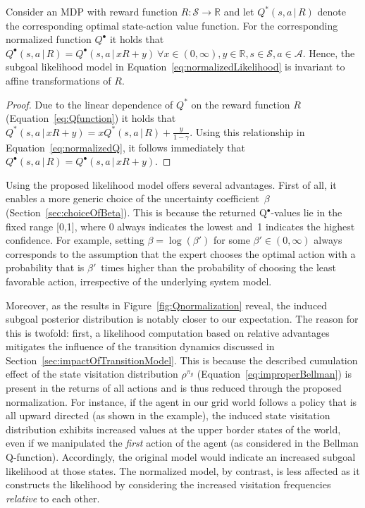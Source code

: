 \documentclass[twoside,11pt]{article}
\newcommand{\given}{\,\vert\,}
\begin{document}
\vspace{0.5\baselineskip}
\begin{proposition}
Consider an MDP with reward function $R:\mathcal{S}\rightarrow\mathbb{R}$ %
and let $Q^*(s,a \given R)$ denote the corresponding optimal state-action value function. For the corresponding normalized function $Q^\bullet$ it holds that $Q^\bullet(s,a \given R) = Q^\bullet(s,a \given xR+y) \ \forall x\in(0,\infty),y\in\mathbb{R}, s\in\mathcal{S}, a\in\mathcal{A}$. Hence, the subgoal likelihood model in Equation~\eqref{eq:normalizedLikelihood} is invariant to affine transformations of $R$.
\end{proposition}
%

\begin{proof}
Due to the linear dependence of $Q^*$ on the reward function $R$ (Equation~\ref{eq:Qfunction}) it holds that $Q^*(s,a \given xR+y) = xQ^*(s,a \given R) + \frac{y}{1-\gamma}$. Using this relationship in Equation~\eqref{eq:normalizedQ}, it follows immediately that $Q^\bullet(s,a \given R) = Q^\bullet(s,a \given xR+y)$.
\end{proof}
%

\noindent Using the proposed likelihood model offers several advantages. First of all, it enables a %
more generic choice of the uncertainty coefficient~$\beta$ (Section~\ref{sec:choiceOfBeta}). This is because the returned Q$^\bullet$-values lie in the fixed range [0,1], where 0 always indicates the lowest and~1 indicates the highest confidence. For example, setting $\beta=\log(\beta')$ for some $\beta'\in(0,\infty)$ always %
%
corresponds to the assumption that the expert chooses the optimal action with a probability that is $\beta'$~times higher than the probability of choosing the least favorable action, irrespective of the underlying system model. 

Moreover, as the results in Figure~\ref{fig:Qnormalization} reveal, the induced subgoal posterior distribution is notably closer to our expectation. %
%
The reason for this is twofold: first, a likelihood computation based on relative advantages mitigates the %
influence of the transition dynamics discussed in Section~\ref{sec:impactOfTransitionModel}. This is because the described cumulation effect of the state visitation distribution $\rho^{\pi_g}$ (Equation~\ref{eq:improperBellman}) %
is present %
in the returns of all actions and is thus %
reduced through the proposed normalization. For instance, if the agent in our grid world follows a policy that is all upward directed (as shown in the example), the induced state visitation distribution exhibits increased values at the upper border states of the world, even if we manipulated the \textit{first} action of the agent (as considered in the Bellman Q-function). Accordingly, the original model would indicate an increased subgoal likelihood at those states. %
The normalized model, by contrast, is less affected as it constructs the likelihood by considering the increased visitation frequencies \textit{relative} to each other. 
%
\end{document}
